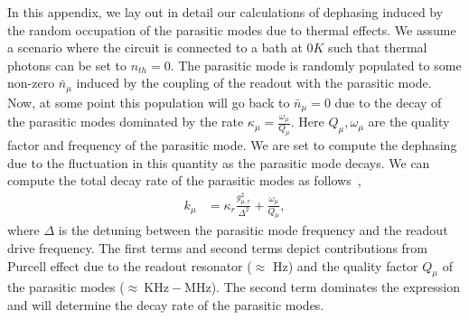 \documentclass[%
reprint,
superscriptaddress,
 amsmath,amssymb,
 aps,
 prx,
longbibliography,
floatfix,
]{revtex4-2}
\begin{document}
In this appendix, we lay out in detail our calculations of dephasing induced by the random occupation of the parasitic modes due to thermal effects. We assume a scenario where the circuit is connected to a bath at $0K$ such that thermal photons can be set to $n_{th}=0$. The parasitic mode is randomly populated to some non-zero $\bar n_\mu$ induced by the coupling of the readout with the parasitic mode. Now, at some point this population will go back to $\bar n_\mu=0$ due to the decay of the parasitic modes dominated by the rate $\kappa_\mu=\frac{\omega_\mu}{Q_\mu}$. Here $Q_\mu,\omega_\mu$ are the quality factor and frequency of the parasitic mode. We are set to compute the dephasing due to the fluctuation in this quantity as the parasitic mode decays. We can compute the total decay rate of the parasitic modes as follows~\cite{gambetta2006qubit}, 
\begin{align}
k_\mu&=\kappa_r \frac{g_{\mu,r}^2}{\Delta^2}+\frac{\omega_\mu}{Q_\mu},
\end{align}
where $\Delta$ is the detuning between the parasitic mode frequency and the readout drive frequency. The first terms and second terms depict contributions from Purcell effect due to the readout resonator ($\approx$ Hz) and the quality factor $Q_\mu$ of the parasitic modes ($\approx \ \mathrm{KHz-MHz}$). The second term dominates the expression and will determine the decay rate of the parasitic modes. 
 
\end{document}
